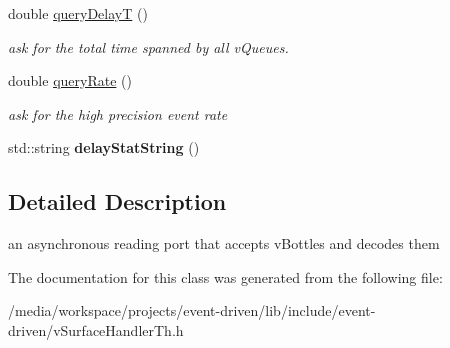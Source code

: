 \begin{DoxyCompactItemize}
\mbox{\label{classev_1_1queueAllocator_a439a2729d5474986977e26e63a9edf03}} 
double \hyperlink{classev_1_1queueAllocator_a439a2729d5474986977e26e63a9edf03}{query\+DelayT} ()
\begin{DoxyCompactList}\small\item\em ask for the total time spanned by all v\+Queues. \end{DoxyCompactList}\item 
\mbox{\label{classev_1_1queueAllocator_a39005a8e9337279debe435ae26c7d6fd}} 
double \hyperlink{classev_1_1queueAllocator_a39005a8e9337279debe435ae26c7d6fd}{query\+Rate} ()
\begin{DoxyCompactList}\small\item\em ask for the high precision event rate \end{DoxyCompactList}\item 
\mbox{\label{classev_1_1queueAllocator_a10282570a776a59efd302bb336109748}} 
std\+::string {\bfseries delay\+Stat\+String} ()
\end{DoxyCompactItemize}


\subsection{Detailed Description}
an asynchronous reading port that accepts v\+Bottles and decodes them 

The documentation for this class was generated from the following file\+:\begin{DoxyCompactItemize}
\item 
/media/workspace/projects/event-\/driven/lib/include/event-\/driven/v\+Surface\+Handler\+Th.\+h\end{DoxyCompactItemize}
